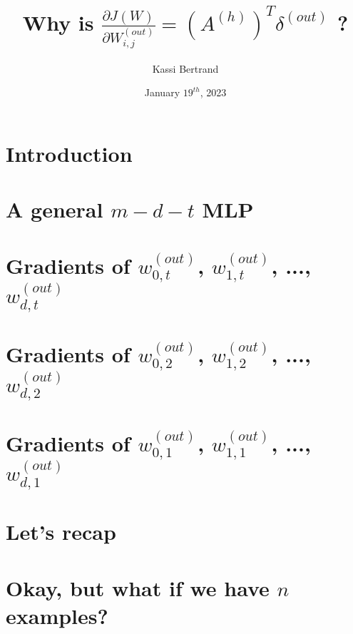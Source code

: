\documentclass[12pt, letterpaper]{article}
\title{Why is $ \frac{\partial J(W)}{\partial W_{i,j}^{(out)}} = (A^{(h)})^{T} \delta^{(out)}$ ?}
\author{Kassi Bertrand}
\date{January $19^{th}$, 2023}
\begin{document}
\maketitle

\section{Introduction}


\section{A general $m-d-t$ MLP}


\section{Gradients of $w_{0,t}^{(out)}$, $w_{1,t}^{(out)}$, ..., $w_{d,t}^{(out)}$}


\pagebreak
\section{Gradients of $w_{0,2}^{(out)}$, $w_{1,2}^{(out)}$, ..., $w_{d,2}^{(out)}$}


\pagebreak
\section{Gradients of $w_{0,1}^{(out)}$, $w_{1,1}^{(out)}$, ..., $w_{d,1}^{(out)}$}


\pagebreak
\section{Let's recap}


\pagebreak
\section{Okay, but what if we have $n$ examples?}

\end{document}
